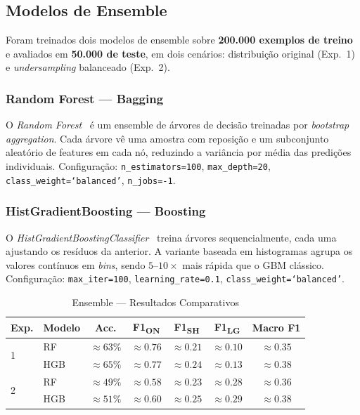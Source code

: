 \documentclass[conference]{IEEEtran}
\begin{document}
\subsection{Modelos de Ensemble}

Foram treinados dois modelos de ensemble sobre \textbf{200.000 exemplos de treino} e
avaliados em \textbf{50.000 de teste}, em dois cenários: distribuição original
(Exp.~1) e \textit{undersampling} balanceado (Exp.~2).

\subsubsection{Random Forest — Bagging}

O \textit{Random Forest}~\cite{breiman} é um ensemble de árvores de decisão treinadas
por \textit{bootstrap aggregation}. Cada árvore vê uma amostra com reposição e um
subconjunto aleatório de features em cada nó, reduzindo a variância por média das
predições individuais. Configuração: \texttt{n\_estimators=100}, \texttt{max\_depth=20},
\texttt{class\_weight=`balanced'}, \texttt{n\_jobs=-1}.

\subsubsection{HistGradientBoosting — Boosting}

O \textit{HistGradientBoostingClassifier}~\cite{friedman} treina árvores
sequencialmente, cada uma ajustando os resíduos da anterior. A variante baseada em
histogramas agrupa os valores contínuos em \textit{bins}, sendo $5$–$10\times$ mais
rápida que o GBM clássico. Configuração: \texttt{max\_iter=100},
\texttt{learning\_rate=0.1}, \texttt{class\_weight=`balanced'}.

\begin{table}[h]
\centering
\caption{Ensemble — Resultados Comparativos}
\label{tab:ensemble}
\setlength{\tabcolsep}{3pt}
\begin{tabular}{llccccc}
\toprule
\textbf{Exp.} & \textbf{Modelo} & \textbf{Acc.} & \textbf{F1\textsubscript{ON}} & \textbf{F1\textsubscript{SH}} & \textbf{F1\textsubscript{LG}} & \textbf{Macro F1} \\
\midrule
\multirow{2}{*}{1} & RF  & $\approx63\%$ & $\approx0.76$ & $\approx0.21$ & $\approx0.10$ & $\approx0.35$ \\
                   & HGB & $\approx65\%$ & $\approx0.77$ & $\approx0.24$ & $\approx0.13$ & $\approx0.38$ \\
\midrule
\multirow{2}{*}{2} & RF  & $\approx49\%$ & $\approx0.58$ & $\approx0.23$ & $\approx0.28$ & $\approx0.36$ \\
                   & HGB & $\approx51\%$ & $\approx0.60$ & $\approx0.25$ & $\approx0.29$ & $\approx0.38$ \\
\bottomrule
\end{tabular}
\end{table}
\end{document}
